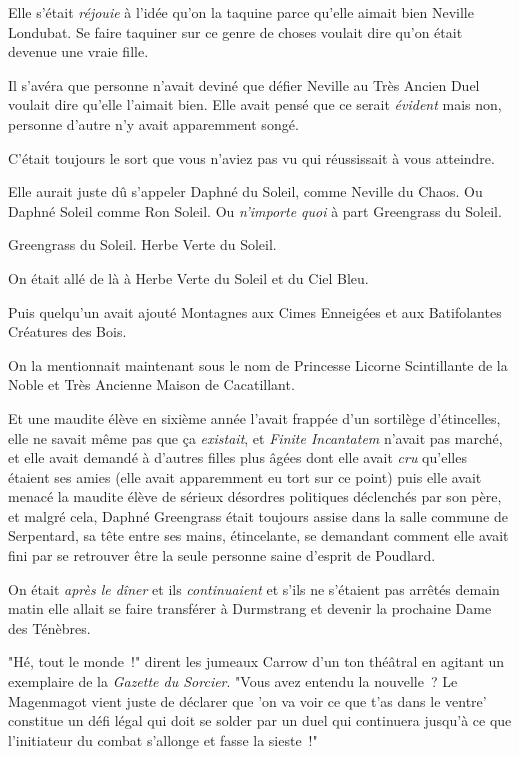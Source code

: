 Elle s'était \emph{réjouie} à l'idée qu'on la taquine parce qu'elle aimait bien Neville Londubat. Se faire taquiner sur ce genre de choses voulait dire qu'on était devenue une vraie fille.

Il s'avéra que personne n'avait deviné que défier Neville au Très Ancien Duel voulait dire qu'elle l'aimait bien. Elle avait pensé que ce serait \emph{évident} mais non, personne d'autre n'y avait apparemment songé.

C'était toujours le sort que vous n'aviez pas vu qui réussissait à vous atteindre.

Elle aurait juste dû s'appeler Daphné du Soleil, comme Neville du Chaos. Ou Daphné Soleil comme Ron Soleil. Ou \emph{n'importe quoi} à part Greengrass du Soleil.

Greengrass du Soleil. Herbe Verte du Soleil.

On était allé de là à Herbe Verte du Soleil et du Ciel Bleu.

Puis quelqu'un avait ajouté Montagnes aux Cimes Enneigées et aux Batifolantes Créatures des Bois.

On la mentionnait maintenant sous le nom de Princesse Licorne Scintillante de la Noble et Très Ancienne Maison de Cacatillant.

Et une maudite élève en sixième année l'avait frappée d'un sortilège d'étincelles, elle ne savait même pas que ça \emph{existait}, et \emph{Finite Incantatem} n'avait pas marché, et elle avait demandé à d'autres filles plus âgées dont elle avait \emph{cru} qu'elles étaient ses amies (elle avait apparemment eu tort sur ce point) puis elle avait menacé la maudite élève de sérieux désordres politiques déclenchés par son père, et malgré cela, Daphné Greengrass était toujours assise dans la salle commune de Serpentard, sa tête entre ses mains, étincelante, se demandant comment elle avait fini par se retrouver être la seule personne saine d'esprit de Poudlard.

On était \emph{après le dîner} et ils \emph{continuaient} et s'ils ne s'étaient pas arrêtés demain matin elle allait se faire transférer à Durmstrang et devenir la prochaine Dame des Ténèbres.

"Hé, tout le monde~!" dirent les jumeaux Carrow d'un ton théâtral en agitant un exemplaire de la \emph{Gazette du Sorcier}. "Vous avez entendu la nouvelle~? Le Magenmagot vient juste de déclarer que 'on va voir ce que t'as dans le ventre' constitue un défi légal qui doit se solder par un duel qui continuera jusqu'à ce que l'initiateur du combat s'allonge et fasse la sieste~!"

